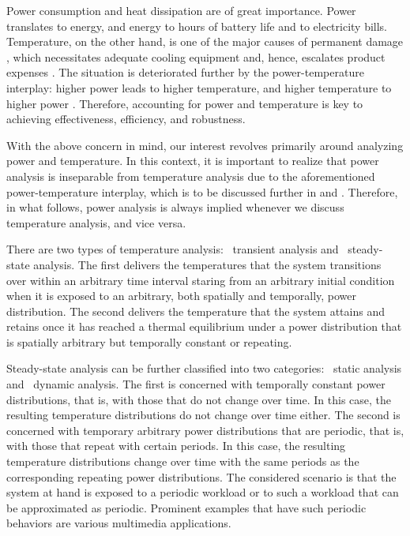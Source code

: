 Power consumption and heat dissipation are of great importance. Power translates
to energy, and energy to hours of battery life and to electricity bills.
Temperature, on the other hand, is one of the major causes of permanent damage
\cite{jedec2016}, which necessitates adequate cooling equipment and, hence,
escalates product expenses \cite{chaudhry2015}. The situation is deteriorated
further by the power-temperature interplay: higher power leads to higher
temperature, and higher temperature to higher power \cite{liu2007}. Therefore,
accounting for power and temperature is key to achieving effectiveness,
efficiency, and robustness.

With the above concern in mind, our interest revolves primarily around analyzing
power and temperature. In this context, it is important to realize that power
analysis is inseparable from temperature analysis due to the aforementioned
power-temperature interplay, which is to be discussed further in
 and . Therefore, in what
follows, power analysis is always implied whenever we discuss temperature
analysis, and vice versa.

There are two types of temperature analysis: \one~transient analysis and
\two~steady-state analysis. The first delivers the temperatures that the system
transitions over within an arbitrary time interval staring from an arbitrary
initial condition when it is exposed to an arbitrary, both spatially and
temporally, power distribution. The second delivers the temperature that the
system attains and retains once it has reached a thermal equilibrium under a
power distribution that is spatially arbitrary but temporally constant or
repeating.

Steady-state analysis can be further classified into two categories: \one~static
analysis and \two~dynamic analysis. The first is concerned with temporally
constant power distributions, that is, with those that do not change over time.
In this case, the resulting temperature distributions do not change over time
either. The second is concerned with temporary arbitrary power distributions
that are periodic, that is, with those that repeat with certain periods. In this
case, the resulting temperature distributions change over time with the same
periods as the corresponding repeating power distributions. The considered
scenario is that the system at hand is exposed to a periodic workload or to such
a workload that can be approximated as periodic. Prominent examples that have
such periodic behaviors are various multimedia applications.

